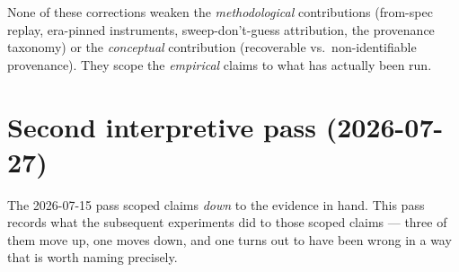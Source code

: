 \documentclass[11pt]{report}
\begin{document}
None of these corrections weaken the \emph{methodological} contributions (from-spec
replay, era-pinned instruments, sweep-don't-guess attribution, the provenance
taxonomy) or the \emph{conceptual} contribution (recoverable vs.\ non-identifiable
provenance). They scope the \emph{empirical} claims to what has actually been run.

\section{Second interpretive pass (2026-07-27)}
\label{sec:revision-2}

The 2026-07-15 pass scoped claims \emph{down} to the evidence in hand. This pass
records what the subsequent experiments did to those scoped claims --- three of them
move up, one moves down, and one turns out to have been wrong in a way that is worth
naming precisely.
\end{document}
